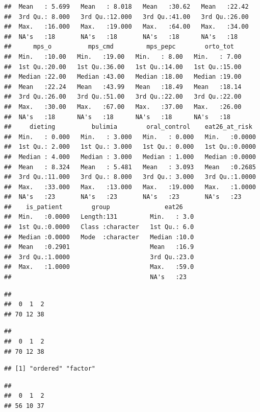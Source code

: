 \documentclass[
]{article}
\begin{document}
\begin{verbatim}
##  Mean   : 5.699   Mean   : 8.018   Mean   :30.62   Mean   :22.42  
##  3rd Qu.: 8.000   3rd Qu.:12.000   3rd Qu.:41.00   3rd Qu.:26.00  
##  Max.   :16.000   Max.   :19.000   Max.   :64.00   Max.   :34.00  
##  NA's   :18       NA's   :18       NA's   :18      NA's   :18     
##      mps_o          mps_cmd         mps_pepc        orto_tot    
##  Min.   :10.00   Min.   :19.00   Min.   : 8.00   Min.   : 7.00  
##  1st Qu.:20.00   1st Qu.:36.00   1st Qu.:14.00   1st Qu.:15.00  
##  Median :22.00   Median :43.00   Median :18.00   Median :19.00  
##  Mean   :22.24   Mean   :43.99   Mean   :18.49   Mean   :18.14  
##  3rd Qu.:26.00   3rd Qu.:51.00   3rd Qu.:22.00   3rd Qu.:22.00  
##  Max.   :30.00   Max.   :67.00   Max.   :37.00   Max.   :26.00  
##  NA's   :18      NA's   :18      NA's   :18      NA's   :18     
##     dieting          bulimia        oral_control    eat26_at_risk   
##  Min.   : 0.000   Min.   : 3.000   Min.   : 0.000   Min.   :0.0000  
##  1st Qu.: 2.000   1st Qu.: 3.000   1st Qu.: 0.000   1st Qu.:0.0000  
##  Median : 4.000   Median : 3.000   Median : 1.000   Median :0.0000  
##  Mean   : 8.324   Mean   : 5.481   Mean   : 3.093   Mean   :0.2685  
##  3rd Qu.:11.000   3rd Qu.: 8.000   3rd Qu.: 3.000   3rd Qu.:1.0000  
##  Max.   :33.000   Max.   :13.000   Max.   :19.000   Max.   :1.0000  
##  NA's   :23       NA's   :23       NA's   :23       NA's   :23      
##    is_patient        group               eat26     
##  Min.   :0.0000   Length:131         Min.   : 3.0  
##  1st Qu.:0.0000   Class :character   1st Qu.: 6.0  
##  Median :0.0000   Mode  :character   Median :10.0  
##  Mean   :0.2901                      Mean   :16.9  
##  3rd Qu.:1.0000                      3rd Qu.:23.0  
##  Max.   :1.0000                      Max.   :59.0  
##                                      NA's   :23
\end{verbatim}

\begin{verbatim}
## 
##  0  1  2 
## 70 12 38
\end{verbatim}

\begin{verbatim}
## 
##  0  1  2 
## 70 12 38
\end{verbatim}

\begin{verbatim}
## [1] "ordered" "factor"
\end{verbatim}

\begin{verbatim}
## 
##  0  1  2 
## 56 10 37
\end{verbatim}
\end{document}
